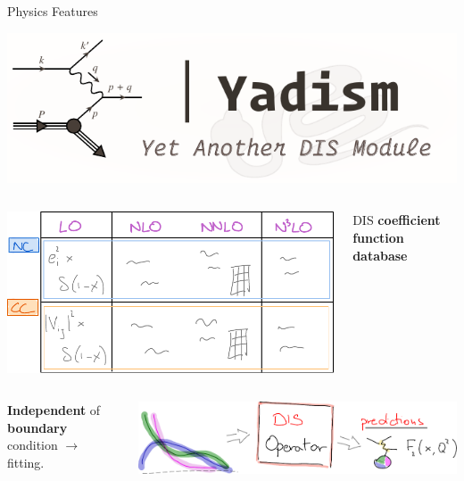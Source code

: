 \documentclass[9pt]{beamer}
\begin{document}
\begin{frame}{\yadism{} Physics Features}
    \vspace*{5pt}
	\begin{center}
		\includegraphics[width=.4\linewidth]{yadism.pdf}
	\end{center}

    \vspace*{5pt}
    \begin{columns}
        \begin{column}{0.5\textwidth}
            \begin{center}
                \includegraphics[width=0.6\linewidth]{dis-db}
            \end{center}
        \end{column}
        \begin{column}{0.4\textwidth}
            DIS \textbf{\alert{coefficient function} database}
        \end{column}
    \end{columns}

    \vspace*{5pt}
    \begin{columns}
        \begin{column}{0.4\textwidth}
            \textbf{Independent} of \textbf{boundary} condition $\to$ \pdf fitting.
        \end{column}
        \begin{column}{0.5\textwidth}
            \begin{center}
                \includegraphics[width=\linewidth]{dis-op}
            \end{center}
        \end{column}
    \end{columns}


\end{frame}
\end{document}
